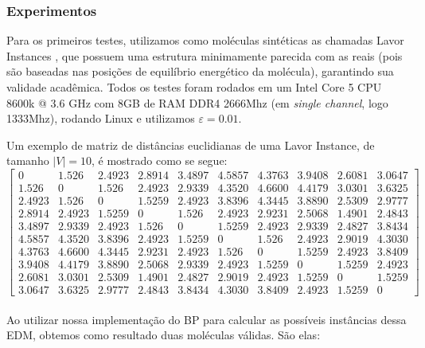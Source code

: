 \documentclass[a4paper,12pt]{article}
\begin{document}
	\subsubsection{Experimentos}
	Para os primeiros testes, utilizamos como moléculas sintéticas as chamadas Lavor Instances \cite{carlile:instancesMDGP}, que possuem uma estrutura minimamente parecida com as reais (pois são baseadas nas posições de equilíbrio energético da molécula), garantindo sua validade acadêmica. Todos os testes foram rodados em um Intel Core 5 CPU 8600k @ 3.6 GHz com 8GB de RAM DDR4 2666Mhz (em \textit{single channel}, logo 1333Mhz), rodando Linux e utilizamos $\varepsilon = 0.01$.
	
	Um exemplo de matriz de distâncias euclidianas de uma Lavor Instance, de tamanho $|V| = 10$, é mostrado como se segue: 
	\\	
		$$
		\begin{bmatrix}
		0 & 1.526 & 2.4923 & 2.8914 & 3.4897 & 4.5857 & 4.3763 & 3.9408 & 2.6081 & 3.0647\\
		1.526 & 0 & 1.526 & 2.4923 & 2.9339 & 4.3520 & 4.6600 & 4.4179 & 3.0301 & 3.6325\\
		2.4923 & 1.526 & 0 & 1.5259 & 2.4923 & 3.8396 & 4.3445 & 3.8890 & 2.5309 & 2.9777\\
		2.8914 & 2.4923 & 1.5259 & 0 & 1.526 & 2.4923 & 2.9231 & 2.5068 & 1.4901 & 2.4843\\
		3.4897 & 2.9339 & 2.4923 & 1.526 & 0 & 1.5259 & 2.4923 & 2.9339 & 2.4827 & 3.8434\\
		4.5857 & 4.3520 & 3.8396 & 2.4923 & 1.5259 & 0 & 1.526 & 2.4923 & 2.9019 & 4.3030\\
		4.3763 & 4.6600 & 4.3445 & 2.9231 & 2.4923 & 1.526 & 0 & 1.5259 & 2.4923 & 3.8409\\
		3.9408 & 4.4179 & 3.8890 & 2.5068 & 2.9339 & 2.4923 & 1.5259 & 0 & 1.5259 & 2.4923\\
		2.6081 & 3.0301 & 2.5309 & 1.4901 & 2.4827 & 2.9019 & 2.4923 & 1.5259 & 0 & 1.5259\\
		3.0647 & 3.6325 & 2.9777 & 2.4843 & 3.8434 & 4.3030 & 3.8409 & 2.4923 & 1.5259 & 0 
		\end{bmatrix}
		$$
	\\
	
	Ao utilizar nossa implementação do BP para calcular as possíveis instâncias dessa EDM, obtemos como resultado duas moléculas válidas. São elas:
	
\end{document}
